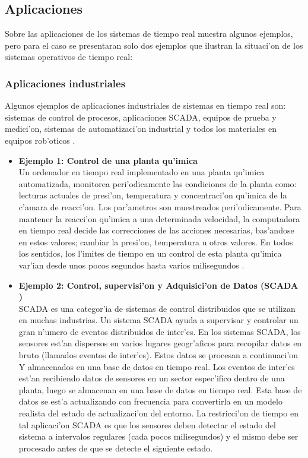 \subsection{Aplicaciones}

Sobre las aplicaciones de los sistemas de tiempo real \citet{mall}  muestra algunos ejemplos, pero para el caso se presentaran solo dos ejemplos que ilustran la situaci'on de los sistemas operativos de tiempo real:

\subsubsection{Aplicaciones industriales}
Algunos ejemplos de aplicaciones industriales de sistemas en tiempo real son: sistemas de control de procesos, aplicaciones SCADA, equipos de prueba y medici'on, sistemas de automatizaci'on industrial y todos los materiales en equipos rob'oticos \citep{mall}.

\begin{itemize}
	\item \textbf{Ejemplo 1: Control de una planta qu'imica}\\
Un ordenador en tiempo real implementado en una planta qu'imica automatizada, monitorea peri'odicamente las condiciones de la planta como: lecturas actuales de presi'on, temperatura y concentraci'on qu'imica de la c'amara de reacci'on. Los par'ametros son muestreados peri'odicamente. Para mantener la reacci'on qu'imica a una determinada velocidad, la computadora en tiempo real decide las correcciones de las acciones necesarias, bas'andose en estos valores; cambiar la presi'on, temperatura u otros valores. En todos los sentidos, los l'imites de tiempo en un control de esta planta qu'imica var'ian desde unos pocos segundos hasta varios milisegundos \citep{mall}. 


\item \textbf{Ejemplo 2: Control, supervisi'on y Adquisici'on de Datos (SCADA )}\\
SCADA es una categor'ia de sistemas de control distribuidos que se utilizan en muchas industrias. Un sistema SCADA ayuda a supervisar y controlar un gran n'umero de eventos distribuidos de inter'es. En los sistemas SCADA, los sensores est'an dispersos en varios lugares geogr'aficos para recopilar datos en bruto (llamados eventos de inter'es). Estos datos se procesan a continuaci'on Y almacenados en una base de datos en tiempo real. Los eventos de inter'es est'an recibiendo datos de sensores en un sector espec'ifico dentro de una planta, luego se almacenan en una base de datos en tiempo real. Esta base de datos se est'a actualizando con frecuencia para convertirla en un modelo realista del estado de actualizaci'on del entorno. La restricci'on de tiempo en tal aplicaci'on SCADA es que los sensores deben detectar el estado del sistema a intervalos regulares (cada pocos milisegundos) y el mismo debe ser procesado antes de que se detecte el siguiente estado\citep{mall}.
\end{itemize}

